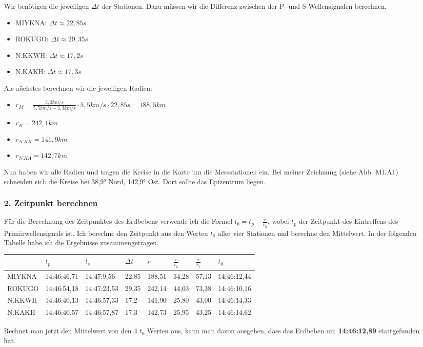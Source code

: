 \documentclass{article}
\begin{document}
Wir benötigen die jeweiligen $\Delta t$ der Stationen. Dazu müssen wir die Differenz zwischen der P- und S-Wellensignalen berechnen.
\begin{itemize}
	\item MIYKNA: $\Delta t \approx 22,85s$ 
	\item ROKUGO: $\Delta t \approx 29,35s$ 
	\item N.KKWH: $\Delta t \approx 17,2s$ 
	\item N.KAKH: $\Delta t \approx 17,3s$ 
\end{itemize}
Als nächstes berechnen wir die jeweiligen Radien: 
\begin{itemize}
	\item $r_M = \frac{3,3km/s}{5,5 km/s - 3,3 km/s} \cdot 5,5 km/s \cdot 22,85 s = 188,5 km$
	\item $r_R = 242,1km$
	\item $r_{N.KK} = 141,9km$
	\item $r_{N.KA} = 142,7km$
\end{itemize}
Nun haben wir alle Radien und tragen die Kreise in die Karte um die Messstationen ein. 
Bei meiner Zeichnung (siehe Abb. M1.A1) schneiden sich die Kreise bei 38,9° Nord, 142,9° Ost. Dort sollte das Epizentrum liegen. 
\subsubsection*{2. Zeitpunkt berechnen}
Für die Berechnung des Zeitpunktes des Erdbebens verwende ich die Formel 
$t_0 = t_p - \frac{r}{v_p}$, 
wobei $t_p$ der Zeitpunkt des Eintreffens des Primärwellensignals ist. 
Ich berechne den Zeitpunkt aus den Werten $t_0$ aller vier Stationen und berechne den Mittelwert. 
In der folgenden Tabelle habe ich die Ergebnisse zusammengetragen.
\begin{center}
\begin{tabular}{l|l|l|l|l|l|l|l}
		   & $t_{p}$         & $t_s$         & $\Delta t$ & $r$      & $\frac{r}{v_p}$    & $\frac{r}{v_s}$    & $t_0$          \\\hline
	MIYKNA & 14:46:46,71 & 14:47:9,56  & 22,85   & 188,51 & 34,28 & 57,13 & 14:46:12,44 \\
	ROKUGO & 14:46:54,18 & 14:47:23,53 & 29,35   & 242,14 & 44,03 & 73,38 & 14:46:10,16 \\
	N.KKWH & 14:46:40,13 & 14:46:57,33 & 17,2    & 141,90 & 25,80 & 43,00 & 14:46:14,33 \\
	N.KAKH & 14:46:40,57 & 14:46:57,87 & 17,3    & 142,73 & 25,95 & 43,25 & 14:46:14,62 
\end{tabular}
\end{center}
Rechnet man jetzt den Mittelwert von den 4 $t_0$ Werten aus, kann man davon ausgehen, 
dass das Erdbeben um \textbf{14:46:12,89} stattgefunden hat.
\end{document}

